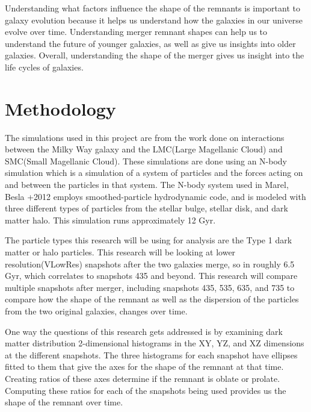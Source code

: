 \documentclass[linenumbers,trackchanges]{aastex7}
\begin{document}
Understanding what factors influence the shape of the remnants is important to galaxy evolution because it helps us understand how the galaxies in our universe evolve over time. Understanding merger remnant shapes can help us to understand the future of younger galaxies, as well as give us insights into older galaxies. Overall, understanding the shape of the merger gives us insight into the life cycles of galaxies.

\section{Methodology} \label{sec:style}

The simulations used in this project are from the work done on interactions between the Milky Way galaxy and the LMC(Large Magellanic Cloud) and SMC(Small Magellanic Cloud).\cite{2012MNRAS.421.2109B} These simulations are done using an N-body simulation which is a simulation of a system of particles and the forces acting on and between the particles in that system. The N-body system used in Marel, Besla +2012 employs smoothed-particle hydrodynamic code, and is modeled with three different types of particles from the stellar bulge, stellar disk, and dark matter halo. This simulation runs approximately 12 Gyr.

The particle types this research will be using for analysis are the Type 1 dark matter or halo particles. This research will be looking at lower resolution(VLowRes) snapshots after the two galaxies merge, so in roughly 6.5 Gyr, which correlates to snapshots 435 and beyond. This research will compare multiple snapshots after merger, including snapshots 435, 535, 635, and 735 to compare how the shape of the remnant as well as the dispersion of the particles from the two original galaxies, changes over time. 

One way the questions of this research gets addressed is by examining dark matter distribution 2-dimensional histograms in the XY, YZ, and XZ dimensions at the different snapshots. The three histograms for each snapshot have ellipses fitted to them that give the axes for the shape of the remnant at that time. Creating ratios of these axes determine if the remnant is oblate or prolate. Computing these ratios for each of the snapshots being used provides us the shape of the remnant over time. 
\end{document}
